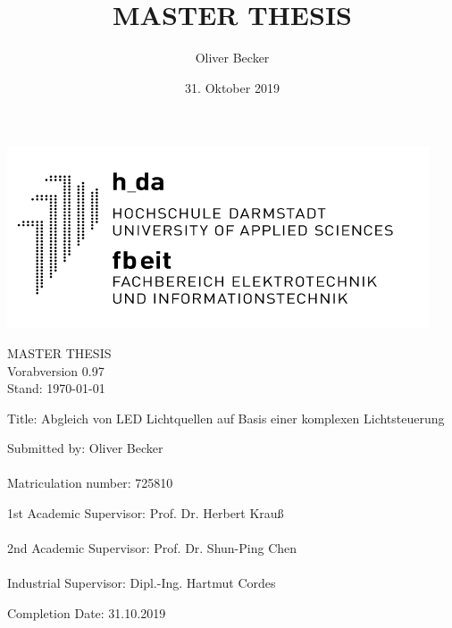 \documentclass[11pt]{scrartcl}
\title{MASTER THESIS}
\author{Oliver Becker}
\date{31. Oktober 2019} %
\begin{document}
\par\vspace{-1cm}
\begin{flushright}
    \includegraphics[width=0.4\linewidth]{images/logo.png}
\end{flushright}
\vspace{1cm}\noindent
\begin{center}
    \huge MASTER THESIS\\
    \huge \color{red} Vorabversion 0.97\\
    \large Stand: \today
\end{center}
\vspace{1cm}\noindent
{\large Title:  Abgleich von LED Lichtquellen auf Basis einer komplexen Lichtsteuerung}
\par\vspace{3cm}\noindent
Submitted by: \hspace{2cm}             Oliver Becker\\
\\
Matriculation number:  \hspace{.6cm}   725810\\
\par\vspace{2cm}\noindent
1st Academic Supervisor: \hspace{.2cm} Prof. Dr. Herbert Krauß\\
\\
2nd Academic Supervisor: \hspace{.05cm} Prof. Dr. Shun-Ping Chen\\
\\
Industrial Supervisor:   \hspace{.75cm} Dipl.-Ing. Hartmut Cordes\\
\par\vspace{2cm}\noindent
Completion Date: \hspace{1.5cm}         31.10.2019
\clearpage
\end{document}
